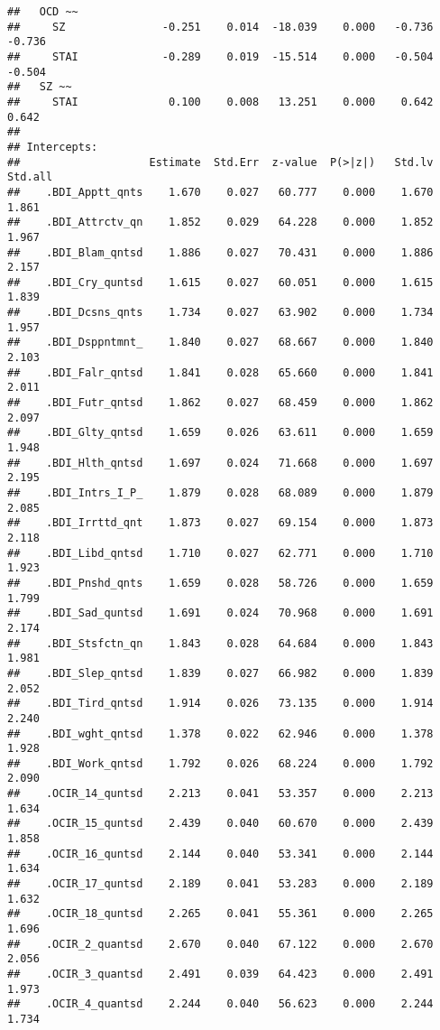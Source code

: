\documentclass[]{article}
\begin{document}
\begin{verbatim}
##   OCD ~~                                                                
##     SZ               -0.251    0.014  -18.039    0.000   -0.736   -0.736
##     STAI             -0.289    0.019  -15.514    0.000   -0.504   -0.504
##   SZ ~~                                                                 
##     STAI              0.100    0.008   13.251    0.000    0.642    0.642
## 
## Intercepts:
##                    Estimate  Std.Err  z-value  P(>|z|)   Std.lv  Std.all
##    .BDI_Apptt_qnts    1.670    0.027   60.777    0.000    1.670    1.861
##    .BDI_Attrctv_qn    1.852    0.029   64.228    0.000    1.852    1.967
##    .BDI_Blam_qntsd    1.886    0.027   70.431    0.000    1.886    2.157
##    .BDI_Cry_quntsd    1.615    0.027   60.051    0.000    1.615    1.839
##    .BDI_Dcsns_qnts    1.734    0.027   63.902    0.000    1.734    1.957
##    .BDI_Dsppntmnt_    1.840    0.027   68.667    0.000    1.840    2.103
##    .BDI_Falr_qntsd    1.841    0.028   65.660    0.000    1.841    2.011
##    .BDI_Futr_qntsd    1.862    0.027   68.459    0.000    1.862    2.097
##    .BDI_Glty_qntsd    1.659    0.026   63.611    0.000    1.659    1.948
##    .BDI_Hlth_qntsd    1.697    0.024   71.668    0.000    1.697    2.195
##    .BDI_Intrs_I_P_    1.879    0.028   68.089    0.000    1.879    2.085
##    .BDI_Irrttd_qnt    1.873    0.027   69.154    0.000    1.873    2.118
##    .BDI_Libd_qntsd    1.710    0.027   62.771    0.000    1.710    1.923
##    .BDI_Pnshd_qnts    1.659    0.028   58.726    0.000    1.659    1.799
##    .BDI_Sad_quntsd    1.691    0.024   70.968    0.000    1.691    2.174
##    .BDI_Stsfctn_qn    1.843    0.028   64.684    0.000    1.843    1.981
##    .BDI_Slep_qntsd    1.839    0.027   66.982    0.000    1.839    2.052
##    .BDI_Tird_qntsd    1.914    0.026   73.135    0.000    1.914    2.240
##    .BDI_wght_qntsd    1.378    0.022   62.946    0.000    1.378    1.928
##    .BDI_Work_qntsd    1.792    0.026   68.224    0.000    1.792    2.090
##    .OCIR_14_quntsd    2.213    0.041   53.357    0.000    2.213    1.634
##    .OCIR_15_quntsd    2.439    0.040   60.670    0.000    2.439    1.858
##    .OCIR_16_quntsd    2.144    0.040   53.341    0.000    2.144    1.634
##    .OCIR_17_quntsd    2.189    0.041   53.283    0.000    2.189    1.632
##    .OCIR_18_quntsd    2.265    0.041   55.361    0.000    2.265    1.696
##    .OCIR_2_quantsd    2.670    0.040   67.122    0.000    2.670    2.056
##    .OCIR_3_quantsd    2.491    0.039   64.423    0.000    2.491    1.973
##    .OCIR_4_quantsd    2.244    0.040   56.623    0.000    2.244    1.734

\end{verbatim}
\end{document}
